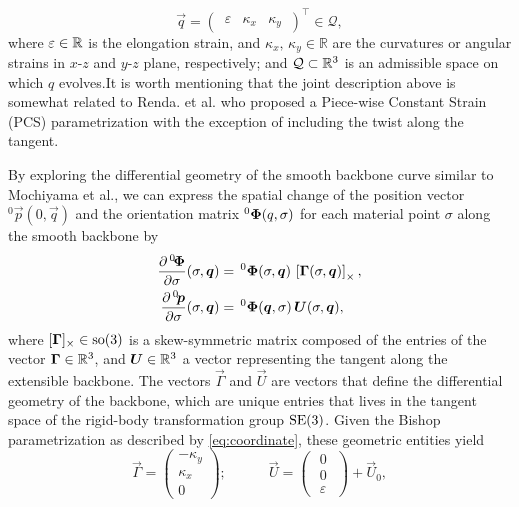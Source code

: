 {\begin{equation}
\vec{q} = \begin{pmatrix}
\,\varepsilon & \kappa_x & \kappa_y\,
\end{pmatrix}^\top \in \mathcal{Q},
\label{eq:coordinate}
\end{equation}
%
\noindent where {$\varepsilon \in \mathbb{R}$ is the elongation strain}, and $\kappa_x,\,\kappa_y\in\mathbb{R}$ are the curvatures or angular strains in $x$-$z$ and $y$-$z$ plane, respectively; and $\mathcal{Q} \subset \mathbb{R}^3$ is an admissible space on which $q$ evolves.It is worth mentioning that the joint description above is somewhat related to Renda. et al. \cite{Renda2018} who proposed a Piece-wise Constant Strain (PCS) parametrization with the exception of including the twist along the tangent.

By exploring the differential geometry of the smooth backbone curve similar to Mochiyama et al.\cite{Mochiyama2003}, we can express the spatial change of the position vector $^0 \vec{p}(0,\vec{q})$ and the orientation matrix $^0\boldsymbol{\Phi}(q,\sigma)$ for each material point $\sigma$ along the smooth backbone by
%
\begin{align}
\renewcommand*{\arraystretch}{2}{}
\frac{\partial \,^0\!\mat{\Phi}}{\partial \sigma}(\sigma,\vec{q}) & = \, ^0\mat{\Phi}(\sigma,\vec{q})\,\left[\mat{\Gamma} (\sigma,\vec{q}) \right]_{\times}, \label{eq:change_phi} \\
\frac{\partial \,^0\! \vec{p}}{\partial \sigma}(\sigma,\vec{q}) & = \, ^0\mat{\Phi}(\vec{q},\sigma) \, \vec{U}(\sigma,\vec{q}), \label{eq:change_p}
\end{align}
%
where $[\boldsymbol{\Gamma}]_\times \in {\text{so}(3)}$ is a skew-symmetric matrix composed of the entries of the vector $\boldsymbol{\Gamma} \in \mathbb{R}^3$, and $\boldsymbol{U}\in \mathbb{R}^3$ a vector representing the tangent along the extensible backbone. The vectors $\vec{\Gamma}$ and $\vec{U}$ are vectors that define the differential geometry of the backbone, which are unique entries that lives in the tangent space of the rigid-body transformation group ${\text{SE}(3)}$. Given the Bishop parametrization as described by \eqref{eq:coordinate}, these geometric entities yield
%
\begin{equation}
\vec{\Gamma} = \begin{pmatrix} -\kappa_y \\ \kappa_x \\ 0  \end{pmatrix}; \quad \quad \quad \vec{U} = \begin{pmatrix} \,\, 0 \,\, \\ \,\, 0 \,\, \\ \, \,\varepsilon \,\, \end{pmatrix} + \vec{U}_0,

\end{equation}}
